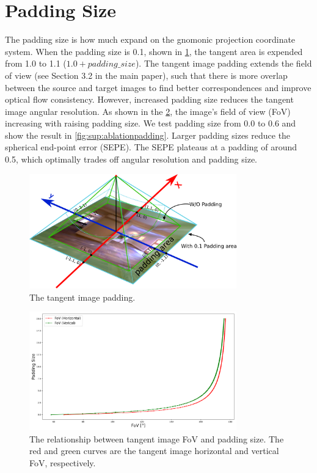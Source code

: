 \section{Padding Size}
\label{sec:sup:ablations}

The padding size is how much expand on the gnomonic projection coordinate system.
When the padding size is 0.1, shown in \cref{fig:sup:howtopadding}, the tangent area is expended from 1.0 to 1.1 ($1.0  + padding\_size$).
The tangent image padding extends the field of view  (see Section 3.2 in the main paper), such that there is more overlap between the source and target images to find better correspondences and improve optical flow consistency.
However, increased padding size reduces the tangent image angular resolution. 
As shown in the \cref{fig:sup:paddingvsfov}, the image's field of view (FoV) increasing with raising padding size.
We test padding size from 0.0 to 0.6 and show the result in \cref{fig:sup:ablationpadding}.
Larger padding sizes reduce the spherical end-point error (SEPE).
The SEPE plateaus at a padding of around 0.5, which optimally trades off angular resolution and padding size.


\begin{figure}[hbt!]
	\centering
	\includegraphics[width=0.80\textwidth]{images/tangent_image/tangent_image_padding.pdf}
	\caption{\label{fig:sup:howtopadding}%
		The tangent image padding.}
\end{figure}

\begin{figure}[hbt!]
	\centering
	\includegraphics[width=0.80\textwidth]{images/paddingsize_vs_fov.pdf}
	\caption{\label{fig:sup:paddingvsfov}%
		The relationship between tangent image FoV and padding size. The red and green curves are the tangent image horizontal and vertical FoV, respectively.}
\end{figure}

